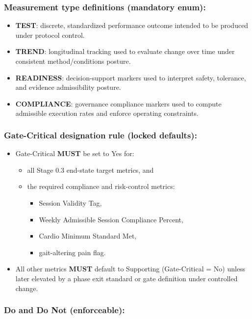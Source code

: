 \documentclass[10pt]{article}
\begin{document}
\subsubsection*{Measurement type definitions (mandatory enum):}

\begin{itemize}
\item \textbf{TEST}: discrete, standardized performance outcome intended to be produced under protocol control.
\item \textbf{TREND}: longitudinal tracking used to evaluate change over time under consistent method/conditions posture.
\item \textbf{READINESS}: decision-support markers used to interpret safety, tolerance, and evidence admissibility posture.
\item \textbf{COMPLIANCE}: governance compliance markers used to compute admissible execution rates and enforce operating constraints.
\end{itemize}

\subsubsection*{Gate-Critical designation rule (locked defaults):}

\begin{itemize}
\item Gate-Critical \textbf{MUST} be set to Yes for:
  \begin{itemize}
  \item all Stage 0.3 end-state target metrics, and
  \item the required compliance and risk-control metrics:
    \begin{itemize}
    \item Session Validity Tag,
    \item Weekly Admissible Session Compliance Percent,
    \item Cardio Minimum Standard Met,
    \item gait-altering pain flag.
    \end{itemize}
  \end{itemize}
\item All other metrics \textbf{MUST} default to Supporting (Gate-Critical = No) unless later elevated by a phase exit standard or gate definition under controlled change.
\end{itemize}

\subsubsection*{Do and Do Not (enforceable):}
\end{document}
